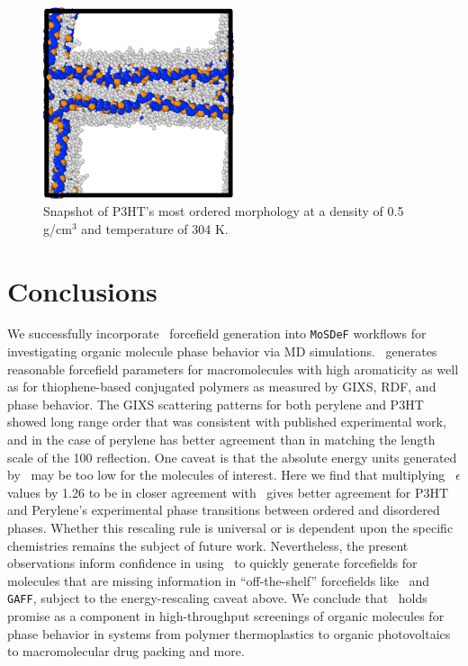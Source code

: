 \begin{figure}[hbt!]
    \centering
    \includegraphics[width=0.5\textwidth]{src/figures/FF_figs/p3ht_0.5den_2.42kT.png}
    \caption{Snapshot of P3HT's most ordered morphology at a density of 0.5 g/cm$^3$ and temperature of 304 K.}
    \label{p3ht_lamellar}
\end{figure}



\section{Conclusions}
We successfully incorporate \esp~forcefield generation into \texttt{MoSDeF} workflows for investigating organic molecule phase behavior via MD simulations. 
\esp~generates reasonable forcefield parameters for macromolecules with high aromaticity as well as for thiophene-based conjugated polymers as measured by GIXS, RDF, and phase behavior.
The GIXS scattering patterns for both perylene and P3HT showed long range order that was consistent with published experimental work, and in the case of perylene has better agreement than \oplsff in matching the length scale of the 100 reflection. 
One caveat is that the absolute energy units generated by \espff~may be too low for the molecules of interest.
Here we find that multiplying \espff~$\epsilon$ values by 1.26 to be in closer agreement with \oplsff~gives better agreement for P3HT and Perylene's experimental phase transitions between ordered and disordered phases.
Whether this rescaling rule is universal or is dependent upon the specific chemistries remains the subject of future work.
Nevertheless, the present observations inform confidence in using \esp~to quickly generate forcefields for molecules that are missing information in ``off-the-shelf'' forcefields like \oplsff~and \texttt{GAFF}, subject to the energy-rescaling caveat above.
We conclude that \esp~holds promise as a component in high-throughput screenings of organic molecules for phase behavior in systems from polymer thermoplastics to organic photovoltaics to macromolecular drug packing and more.
